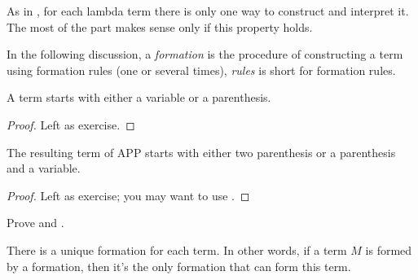 \documentclass[../../../include/open-logic-section]{subfiles}
\begin{document}

As in \olref[fol][syn][unq], for each lambda term there is only one
way to construct and interpret it. The most of the part makes
sense only if this property holds.

In the following discussion, a \emph{formation} is the procedure of
constructing a term using formation rules (one or several times), \emph{rules} is short for
formation rules. 

\begin{lem}
  A term starts with either a variable or a parenthesis.
\end{lem}
\begin{proof}
  Left as exercise.
\end{proof}

\begin{lem}
  The resulting term of APP starts with either two parenthesis or a
  parenthesis and a variable.
\end{lem}
\begin{proof}
  Left as exercise; you may want to use .
\end{proof}

\begin{prob}
  Prove  and .
\end{prob}

\begin{prop} 
There is a unique formation for each term. In other words, if a term
$M$ is formed by a formation, then it's the only formation that can form this term.
\end{prop}
\end{document}
